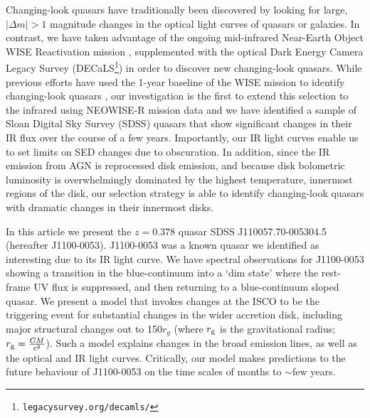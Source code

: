 \documentclass{nature}
\begin{document}
Changing-look quasars have traditionally been discovered by looking
for large, $| \Delta m | >1$ magnitude changes in the optical light
curves of quasars or galaxies. In contrast, we have taken advantage of
the ongoing mid-infrared Near-Earth Object WISE Reactivation mission
\cite[NEOWISE-R; ][]{Mainzer2014, Meisner2017a, Meisner2017b},
supplemented with the optical Dark Energy Camera Legacy Survey
(DECaLS\footnote{{\tt legacysurvey.org/decamls/}}) in order to
discover new changing-look quasars.  While previous efforts have used
the 1-year baseline of the WISE mission to identify changing-look
quasars \cite[e.g.,][]{Assef2017}, our investigation is the first to
extend this selection to the infrared using NEOWISE-R mission data and
we have identified a sample of Sloan Digital Sky Survey (SDSS) quasars
that show significant changes in their IR flux over the course of a
few years. Importantly, our IR light curves enable us to set limits on
SED changes due to obscuration. In addition, since the IR emission
from AGN is reprocessed disk emission, and because disk bolometric
luminosity is overwhelmingly dominated by the highest temperature,
innermost regions of the disk, our selection strategy is able to
identify changing-look quasars with dramatic changes in their innermost disks.

In this article we present the $z=0.378$ quasar SDSS
J110057.70-005304.5 (hereafter J1100-0053).  J1100-0053 was a known
quasar we identified as interesting due to its IR light curve. We have
spectral observations for J1100-0053 showing a transition in the
blue-continuum into a `dim state' where the rest-frame UV flux is
suppressed, and then returning to a blue-continuum sloped quasar.  We
present a model that invokes changes at the ISCO to be the triggering
event for substantial changes in the wider accretion disk, including
major structural changes out to 150$r_{g}$ (where $r_{\rm g}$ is the
gravitational radius; $r_{\rm g}=\frac{GM}{c^2}$).  Such a model
explains changes in the broad emission lines, as well as the optical
and IR light curves. Critically, our model makes predictions to the
future behaviour of J1100-0053 on the time scales of months to
$\sim$few years.
\end{document}
